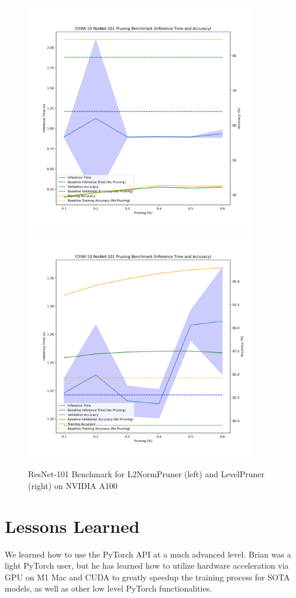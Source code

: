 \documentclass{article}
\begin{document}
\begin{figure}
    \centerline{
        \includegraphics[width=4in]{../proj1/figures/resnet101_benchmark_l2.png}
        \includegraphics[width=4in]{../proj1/figures/resnet101_benchmark_level.png}
    }
    \caption{ResNet-101 Benchmark for L2NormPruner (left) and LevelPruner (right) on NVIDIA A100}
    \label{fig:otherpruner}
\end{figure}


\section{Lessons Learned}
We learned how to use the PyTorch API at a much advanced level. Brian was a light PyTorch user, but he has learned how to utilize hardware acceleration via GPU on M1 Mac and CUDA to greatly speedup the training process for SOTA models, as well as other low level PyTorch functionalities.
\end{document}
